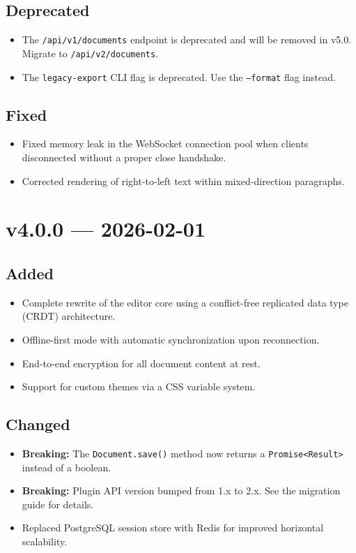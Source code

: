 \documentclass[
    language=english,
    doctype=article,
    institution=none,
]{../../omnilatex}
\begin{document}
\subsection{Deprecated}
\begin{itemize}
    \item The \texttt{/api/v1/documents} endpoint is deprecated and will be
          removed in v5.0.  Migrate to \texttt{/api/v2/documents}.
    \item The \texttt{legacy-export} CLI flag is deprecated.  Use the
          \texttt{--format} flag instead.
\end{itemize}

\subsection{Fixed}
\begin{itemize}
    \item Fixed memory leak in the WebSocket connection pool when clients
          disconnected without a proper close handshake.
    \item Corrected rendering of right-to-left text within mixed-direction
          paragraphs.
\end{itemize}

\section{v4.0.0 --- 2026-02-01}

\subsection{Added}
\begin{itemize}
    \item Complete rewrite of the editor core using a conflict-free
          replicated data type (CRDT) architecture.
    \item Offline-first mode with automatic synchronization upon reconnection.
    \item End-to-end encryption for all document content at rest.
    \item Support for custom themes via a CSS variable system.
\end{itemize}

\subsection{Changed}
\begin{itemize}
    \item \textbf{Breaking:} The \texttt{Document.save()} method now returns
          a \texttt{Promise<Result>} instead of a boolean.
    \item \textbf{Breaking:} Plugin API version bumped from 1.x to 2.x.
          See the migration guide for details.
    \item Replaced PostgreSQL session store with Redis for improved
          horizontal scalability.
\end{itemize}
\end{document}
